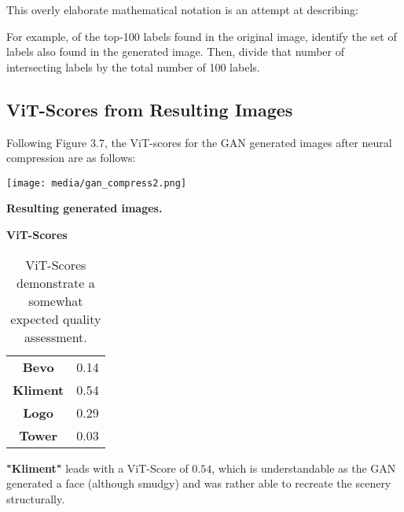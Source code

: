 This overly elaborate mathematical notation is an attempt at describing:

\vspace{1mm}


\vspace{4mm}    

For example, of the top-100 labels found in the original image, 
identify the set of labels also found in the generated image. 
Then, divide that number of intersecting
labels by the total number of 100 labels.


\subsection{ViT-Scores from Resulting Images}


Following Figure 3.7, the ViT-scores for the GAN generated images after neural compression
are as follows:

\begin{center}
	\texttt{[image: media/gan\_compress2.png]}

    \textbf{Resulting generated images.}
\end{center}

\newpage

\textbf{ViT-Scores}

\begin{table}[H]
\begin{center}
\begin{tabular}{|c|c|}
\hline
\textbf{Bevo}	& 0.14\\
\textbf{Kliment}	& 0.54\\
\textbf{Logo}	& 0.29\\
\textbf{Tower} & 0.03\\\hline

\end{tabular}
\caption[ViT-Scores of Generated Images]{ViT-Scores demonstrate a somewhat expected quality assessment.}
\end{center}
\end{table}



\textbf{"Kliment"} leads with a ViT-Score of $0.54$, which is understandable as the GAN 
generated a face (although smudgy) and was rather able to recreate the scenery structurally.

